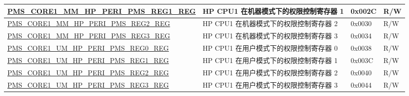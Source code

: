 \begin{longtable}{ | L{7.2cm} | L{6cm} | L{1.3cm} | L{1cm} | }
\hyperref[regdesc:PMSCORENMMHPPERIPMSREG1REG]{PMS\_CORE1\_MM\_HP\_PERI\_PMS\_REG1\_REG} & HP CPU1 在机器模式下的权限控制寄存器 1 & 0x002C & R/W \\ \hline
\hyperref[regdesc:PMSCORENMMHPPERIPMSREG2REG]{PMS\_CORE1\_MM\_HP\_PERI\_PMS\_REG2\_REG} & HP CPU1 在机器模式下的权限控制寄存器 2 & 0x0030 & R/W \\ \hline
\hyperref[regdesc:PMSCORENMMHPPERIPMSREG3REG]{PMS\_CORE1\_MM\_HP\_PERI\_PMS\_REG3\_REG} & HP CPU1 在机器模式下的权限控制寄存器 3 & 0x0034 & R/W \\ \hline
\hyperref[regdesc:PMSCORENUMHPPERIPMSREG0REG]{PMS\_CORE1\_UM\_HP\_PERI\_PMS\_REG0\_REG} & HP CPU1 在用户模式下的权限控制寄存器 0 & 0x0038 & R/W \\ \hline
\hyperref[regdesc:PMSCORENUMHPPERIPMSREG1REG]{PMS\_CORE1\_UM\_HP\_PERI\_PMS\_REG1\_REG} & HP CPU1 在用户模式下的权限控制寄存器 1 & 0x003C & R/W \\ \hline
\hyperref[regdesc:PMSCORENUMHPPERIPMSREG2REG]{PMS\_CORE1\_UM\_HP\_PERI\_PMS\_REG2\_REG} & HP CPU1 在用户模式下的权限控制寄存器 2 & 0x0040 & R/W \\ \hline
\hyperref[regdesc:PMSCORENUMHPPERIPMSREG3REG]{PMS\_CORE1\_UM\_HP\_PERI\_PMS\_REG3\_REG} & HP CPU1 在用户模式下的权限控制寄存器 3 & 0x0044 & R/W \\ \hline
\end{longtable}
